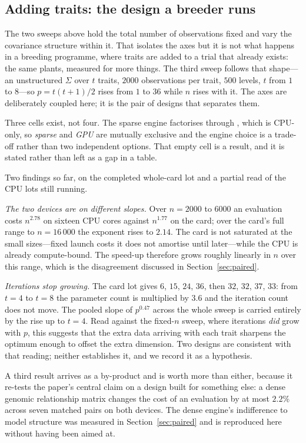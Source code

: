 \documentclass[article]{jss}
\begin{document}
\subsection{Adding traits: the design a breeder runs}\label{sec:traits}

The two sweeps above hold the total number of observations fixed and vary the
covariance structure within it. That isolates the axes but it is not what
happens in a breeding programme, where traits are added to a trial that
already exists: the same plants, measured for more things. The third sweep
follows that shape---an unstructured $\Sigma$ over $t$ traits, $2000$
observations per trait, $500$ levels, $t$ from $1$ to $8$---so $p = t(t+1)/2$
rises from $1$ to $36$ while $n$ rises with it. The axes are deliberately
coupled here; it is the pair of designs that separates them.

Three cells exist, not four. The sparse engine factorises through
, which is CPU-only, so \emph{sparse} and \emph{GPU} are mutually
exclusive and the engine choice is a trade-off rather than two independent
options. That empty cell is a result, and it is stated rather than left as a
gap in a table.

Two findings so far, on the completed whole-card lot and a partial read of the
CPU lots still running.

\emph{The two devices are on different slopes.} Over $n = 2000$ to $6000$ an
evaluation costs $n^{2.78}$ on sixteen CPU cores against $n^{1.77}$ on the
card; over the card's full range to $n = 16\,000$ the exponent rises to
$2.14$. The card is not saturated at the small sizes---fixed launch costs it
does not amortise until later---while the CPU is already compute-bound. The
speed-up therefore grows roughly linearly in $n$ over this range, which is the
disagreement discussed in Section~\ref{sec:paired}.

\emph{Iterations stop growing.} The card lot gives $6$, $15$, $24$, $36$, then
$32$, $32$, $37$, $33$: from $t = 4$ to $t = 8$ the parameter count is
multiplied by $3.6$ and the iteration count does not move. The pooled slope of
$p^{0.47}$ across the whole sweep is carried entirely by the rise up to
$t = 4$. Read against the fixed-$n$ sweep, where iterations \emph{did} grow
with $p$, this suggests that the extra data arriving with each trait sharpens
the optimum enough to offset the extra dimension. Two designs are consistent
with that reading; neither establishes it, and we record it as a hypothesis.

A third result arrives as a by-product and is worth more than either, because
it re-tests the paper's central claim on a design built for something else:
a dense genomic relationship matrix changes the cost of an evaluation by at
most $2.2\%$ across seven matched pairs on both devices. The dense engine's
indifference to model structure was measured in Section~\ref{sec:paired} and
is reproduced here without having been aimed at.
\end{document}
